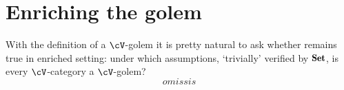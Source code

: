 \documentclass[a4paper,10pt,draft]{amsart}
\begin{document}

\section{Enriching the golem}
With the definition of a $\cV$-golem it is pretty natural to ask whether  remains true in enriched setting: under which assumptions, `trivially' verified by $\Set$, is every $\cV$-category a $\cV$-golem?
\[
omissis
\]
\hrulefill
{}

\end{document}
